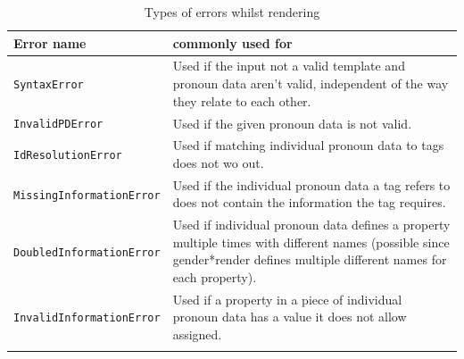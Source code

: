 \documentclass{article}
\newcommand{\GenderRender}{
    gender*render
}
\begin{document}
    \begin{flushleft}
        \begin{center}
            \begin{longtable}{|>{\raggedright\arraybackslash}p{13em} | >{\raggedright\arraybackslash}p{19em} |}
                 \hline
                 Error name & commonly used for \\
                 \hline\hline
                 \texttt{SyntaxError} & Used if the input not a valid template and pronoun data aren't valid, independent of the way they relate to each other. \\
                 \hline
                 \texttt{InvalidPDError} & Used if the given pronoun data is not valid. \\
                 \hline
                 \texttt{IdResolutionError} & Used if matching individual pronoun data to tags does not wo out.\\
                 \hline
                 \texttt{MissingInformationError} & Used if the individual pronoun data a tag refers to does not contain the information the tag requires.\\
                 \hline
                 \texttt{DoubledInformationError} & Used if individual pronoun data defines a property multiple times with different names (possible since \GenderRender defines multiple different names for each property). \\
                 \hline
                 \texttt{InvalidInformationError} & Used if a property in a piece of individual pronoun data has a value it does not allow assigned. \\
                 \hline
                \caption{Types of errors whilst rendering}
            \end{longtable}
        \end{center}
    \end{flushleft}
\end{document}

